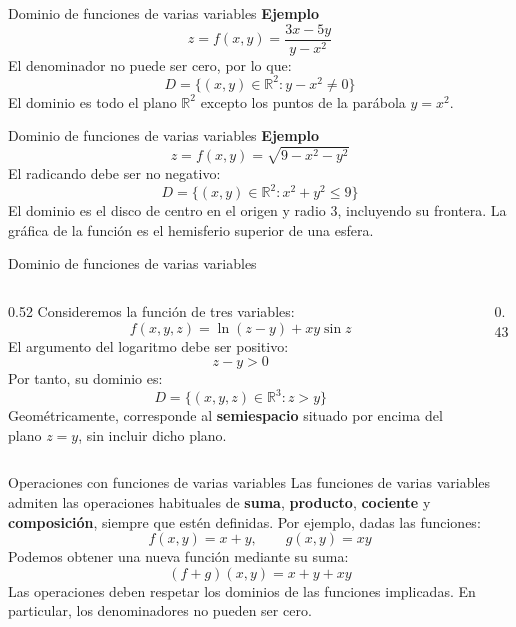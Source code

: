 \documentclass[main.tex]{subfiles}
\begin{document}
\begin{frame}{Dominio de funciones de varias variables}
\textbf{Ejemplo}
\[
z=f(x,y)=\frac{3x-5y}{y-x^2}
\]
El denominador no puede ser cero, por lo que:
\[
D=\{(x,y)\in\mathbb{R}^2:y-x^2\neq 0\}
\]
El dominio es todo el plano $\mathbb{R}^2$ excepto los puntos de la parábola $y=x^2$.
\end{frame}
\begin{frame}{Dominio de funciones de varias variables}
\textbf{Ejemplo}
\[
z=f(x,y)=\sqrt{9-x^2-y^2}
\]
El radicando debe ser no negativo:
\[
D=\{(x,y)\in\mathbb{R}^2:x^2+y^2\leq 9\}
\]
\small El dominio es el disco de centro en el origen y radio $3$, incluyendo su frontera. La gráfica de la función es el hemisferio superior de una esfera.
\end{frame}
\begin{frame}{Dominio de funciones de varias variables}
\begin{columns}[c]
\begin{column}{0.52\textwidth}
Consideremos la función de tres variables:
\[
f(x,y,z)=\ln(z-y)+xy\sin z
\]
El argumento del logaritmo debe ser positivo:
\[
z-y>0
\]
Por tanto, su dominio es:
\[
D=\{(x,y,z)\in\mathbb{R}^3:z>y\}
\]
Geométricamente, corresponde al \textbf{semiespacio} situado por encima del plano $z=y$, sin incluir dicho plano.
\end{column}
\begin{column}{0.43\textwidth}
\centering
{}
\end{column}
\end{columns}
\end{frame}
\begin{frame}{Operaciones con funciones de varias variables}
Las funciones de varias variables admiten las operaciones habituales de \textbf{suma}, \textbf{producto}, \textbf{cociente} y \textbf{composición}, siempre que estén definidas.
\vspace{0.5cm}
Por ejemplo, dadas las funciones:
\[
f(x,y)=x+y,\qquad g(x,y)=xy
\]
Podemos obtener una nueva función mediante su suma:
\[
(f+g)(x,y)=x+y+xy
\]
\vspace{0.5cm}
Las operaciones deben respetar los dominios de las funciones implicadas. En particular, los denominadores no pueden ser cero.
\end{frame}
\end{document}
